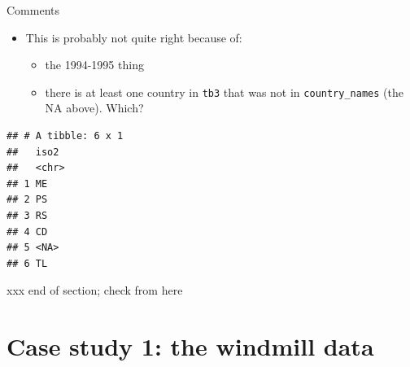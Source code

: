 \documentclass[ignorenonframetext,]{beamer}
\newenvironment{Shaded}{\begin{snugshade}}{\end{snugshade}}
\newcommand{\DataTypeTok}[1]{\textcolor[rgb]{0.13,0.29,0.53}{#1}}
\newcommand{\KeywordTok}[1]{\textcolor[rgb]{0.13,0.29,0.53}{\textbf{#1}}}
\newcommand{\NormalTok}[1]{#1}
\newcommand{\OperatorTok}[1]{\textcolor[rgb]{0.81,0.36,0.00}{\textbf{#1}}}
\newcommand{\StringTok}[1]{\textcolor[rgb]{0.31,0.60,0.02}{#1}}
\providecommand{\tightlist}{%
  \setlength{\itemsep}{0pt}\setlength{\parskip}{0pt}}
\begin{document}
\begin{frame}[fragile]{Comments}
\protect\hypertarget{comments-9}{}

\begin{itemize}
\tightlist
\item
  This is probably not quite right because of:

  \begin{itemize}
  \tightlist
  \item
    the 1994-1995 thing
  \item
    there is at least one country in \texttt{tb3} that was not in
    \texttt{country\_names} (the NA above). Which?
  \end{itemize}
\end{itemize}

\begin{Shaded}
\end{Shaded}

\begin{verbatim}
## # A tibble: 6 x 1
##   iso2 
##   <chr>
## 1 ME   
## 2 PS   
## 3 RS   
## 4 CD   
## 5 <NA> 
## 6 TL
\end{verbatim}

xxx end of section; check from here

\end{frame}

\hypertarget{case-study-1-the-windmill-data}{%
\section{Case study 1: the windmill
data}\label{case-study-1-the-windmill-data}}
\end{document}
